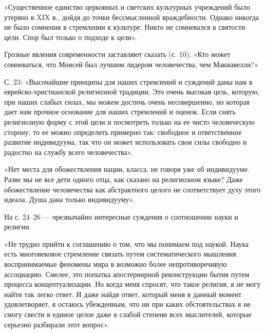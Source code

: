 «Существенное единство церковных и светских культурных учреждений было утеряно
в XIX в., дойдя до точки бессмысленной враждебности. Однако никогда не было
сомнения в стремлении к культуре. Никто не сомневался в святости цели. Спор был
только о подходе к цели».

Грозные явления современности заставляют сказать (с. 10): «Кто может
сомневаться, что Моисей был лучшим лидером человечества, чем Макиавелли?»

С. 23: «Высочайшие принципы для наших стремлений и суждений даны нам в
еврейско-христианской религиозной традиции. Это очень высокая цель, которую,
при наших слабых силах, мы можем достичь очень несовершенно, но которая дает
нам прочное основание для наших стремлений и оценок. Если снять религиозную
форму с этой цели и посмотреть только на ее чисто человеческую сторону, то ее
можно определить примерно так: свободное и ответственное развитие индивидуума,
так что он может использовать свои силы свободно и радостно на службу всего
человечества».

«Нет места для обожествления нации, класса, не говоря уже об индивидууме. Разве
мы не все дети одного отца, как сказано на религиозном языке? Даже
обожествление человечества как абстрактного целого не соответствует духу этого
идеала. Душа дана только индивидууму».

На с. 24--26 --- чрезвычайно интересные суждения о соотношении науки и религии.

«Не трудно прийти к соглашению о том, что мы понимаем под наукой. Наука есть
многовековое стремление связать путем систематического мышления воспринимаемые
феномены мира в возможно более непротиворечивую ассоциацию. Смелее, это попытка
апостериорной реконструкции бытия путем процесса концептуализации. Но когда
меня спросят, что такое религия, я не могу найти так легко ответ. И даже найдя
ответ, который меня в данный момент удовлетворяет, я остаюсь убежденным, что ни
при каких обстоятельствах я не смогу свести в единое целое даже в слабой
степени всех мыслителей, которые серьезно разбирали этот вопрос».

